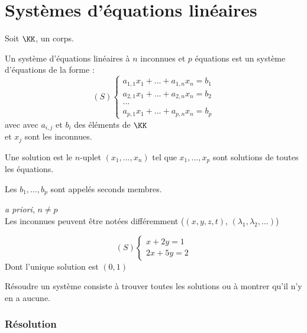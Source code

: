 \documentclass[../main.tex]{subfile}
\begin{document}
\part{Systèmes d'équations linéaires}

Soit $\KK$, un corps.
\begin{defi}
	Un système d'équations linéaires à $n$ inconnues et $p$ équations est un système d'équations de la forme :
	$$
	(S)
	\left\{
	\begin{array}{l}
		a_{1,1}x_1 + ... + a_{1,n}x_n = b_1\\
		a_{2,1}x_1 + ... + a_{2,n}x_n = b_2\\
		...\\
		a_{p,1}x_1 + ... + a_{p,n}x_n = b_p
	\end{array}
	\right.
	$$
	avec avec $a_{i,j}$ et $b_i$ des éléments de $\KK$\\
	et $x_j$ sont les inconnues.
\end{defi}

\begin{defi}
	Une solution est le $n$-uplet $(x_1, ..., x_n)$ tel que $x_1, ..., x_p$ sont solutions de toutes les équations.
\end{defi}

\begin{defi}
	Les $b_1, ..., b_p$ sont appelés seconds membres.
\end{defi}

\begin{rema}
	\textit{a priori}, $n \neq p$\\
	Les inconnues peuvent être notées différemment ($(x, y, z, t)$, $(\lambda_1, \lambda_2, ...)$)
\end{rema}

\begin{ex}
	$$
	(S)
	\left\{
	\begin{array}{l}
		x + 2y = 1\\
		2x + 5y = 2
	\end{array}
	\right.
	$$
	Dont l'unique solution est $(0, 1)$
\end{ex}

\begin{rema}
	Résoudre un système consiste à trouver toutes les solutions ou à montrer qu'il n'y en a aucune.
\end{rema}

\section{Résolution}
\end{document}
